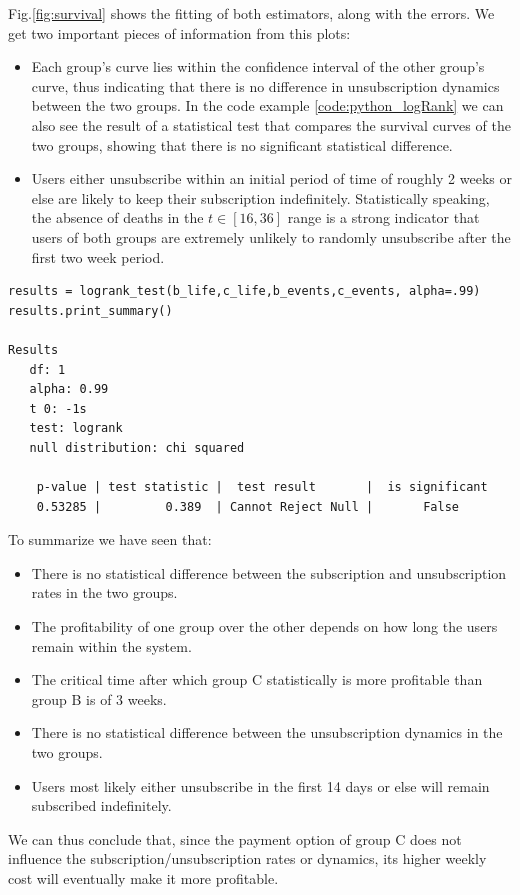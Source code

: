 \documentclass[paper=a4, fontsize=10pt]{report}
\begin{document}
Fig.\ref{fig:survival} shows the fitting of both estimators, along with the errors. We get two important pieces of information
from this plots:
\begin{itemize}
 \item Each group's curve lies within the confidence interval of the other group's curve, thus indicating that there is no difference in unsubscription dynamics between the two groups.
 In the code example \ref{code:python_logRank} we can also see the result of a statistical test
that compares the survival curves of the two groups, showing that there is no significant statistical difference.

 \item  Users either unsubscribe within an initial period of time of roughly 2 weeks or else are likely to keep their subscription indefinitely. Statistically
speaking, the absence of deaths in the $t \in [16,36]$ range is a strong indicator that users of both groups are extremely unlikely to randomly
unsubscribe after the first two week period.
\end{itemize}




\scriptsize
\begin{lstlisting}[frame=single,caption=LogRank test \label{code:python_logRank}]
results = logrank_test(b_life,c_life,b_events,c_events, alpha=.99)
results.print_summary()

Results
   df: 1
   alpha: 0.99
   t 0: -1s
   test: logrank
   null distribution: chi squared

    p-value | test statistic |  test result       |  is significant
    0.53285 |         0.389  | Cannot Reject Null |       False       

\end{lstlisting}

\normalsize


To summarize we have seen that:
\begin{itemize}
 \item There is no statistical difference between the subscription and unsubscription rates in the two groups.
 \item The profitability of one group over the other depends on how long the users remain within the system.
 \item The critical time after which group C statistically is more profitable than group B is of 3 weeks.
  \item There is no statistical difference between the unsubscription dynamics in the two groups.
 \item Users most likely either unsubscribe in the first 14 days or else will remain subscribed indefinitely.
\end{itemize}

We can thus conclude that, since the payment option of group C does not influence the subscription/unsubscription rates or dynamics, its
higher weekly cost will eventually make it more profitable.
\end{document}
